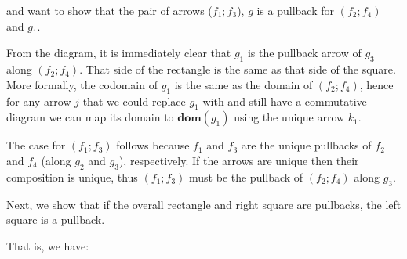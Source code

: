 \documentclass{article}
\begin{document}
\begin{enumerate}
  and want to show that the pair of arrows ($f_1; f_3$), $g$ is a pullback for $(f_2; f_4)$ and $g_1$.

  \begin{center}
  \end{center}

  From the diagram, it is immediately clear that $g_1$ is the pullback arrow of $g_3$ along $(f_2; f_4)$.
  That side of the rectangle is the same as that side of the square.
  More formally, the codomain of $g_1$ is the same as the domain of $(f_2; f_4)$, hence for any arrow $j$ that we could replace $g_1$ with and still have a commutative diagram we can map its domain to $\textbf{dom}(g_1)$ using the unique arrow $k_1$.

  The case for $(f_1; f_3)$ follows because $f_1$ and $f_3$ are the unique pullbacks of $f_2$ and $f_4$ (along $g_2$ and $g_3$), respectively.
  If the arrows are unique then their composition is unique, thus $(f_1; f_3)$ must be the pullback of $(f_2; f_4)$ along $g_3$.

  Next, we show that if the overall rectangle and right square are pullbacks, the left square is a pullback.
  
  That is, we have:
  

\end{enumerate}
\end{document}
